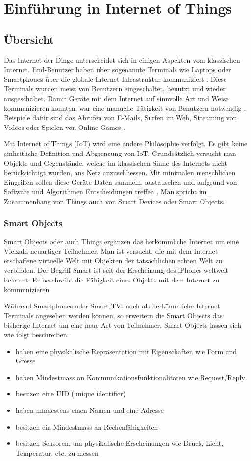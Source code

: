 \chapter{Einführung in Internet of Things}
\section{Übersicht}
Das Internet der Dinge unterscheidet sich in einigen Aspekten vom klassischen Internet. End-Benutzer haben über sogenannte Terminals wie Laptops oder Smartphones über die globale Internet Infrastruktur kommuniziert \cite{MiorandiSicariPellegriniChlamtac12}. Diese Terminals wurden meist von Benutzern eingeschaltet, benutzt und wieder ausgeschaltet. Damit Geräte mit dem Internet auf sinnvolle Art und Weise kommunizieren konnten, war eine manuelle Tätigkeit von Benutzern notwendig \cite{Radovici15}. Beispiele dafür sind das Abrufen von E-Mails, Surfen im Web, Streaming von Videos oder Spielen von Online Games \cite{MiorandiSicariPellegriniChlamtac12}.

Mit \glqq Internet of Things\grqq{} (IoT) wird eine andere Philosophie verfolgt. Es gibt keine einheitliche Definition und Abgrenzung von IoT. Grundsätzlich versucht man Objekte und Gegenstände, welche im klassischen Sinne des Internets nicht berücksichtigt wurden, ans Netz anzuschliessen. Mit minimalen menschlichen Eingriffen sollen diese Geräte Daten sammeln, austauschen und aufgrund von Software und Algorithmen Entscheidungen treffen \cite{RoseEldridgeChapin15}. Man spricht im Zusammenhang von \glqq Things \grqq{} auch von \glqq Smart Devices\grqq{} oder \glqq Smart Objects\grqq .
\subsection{Smart Objects}
Smart Objects oder auch \glqq Things\grqq{} ergänzen das herkömmliche Internet um eine Vielzahl neuartiger Teilnehmer. Man ist versucht, die mit dem Internet erschaffene virtuelle Welt mit Objekten der tatsächlichen \glqq echten\grqq{} Welt zu verbinden. Der Begriff \glqq Smart\grqq{} ist seit der Erscheinung des iPhones weltweit bekannt. Er beschreibt die Fähigkeit eines Objekts mit dem Internet zu kommunizieren. 

Während Smartphones oder Smart-TVs noch als herkömmliche Internet Terminals angesehen werden können, so erweitern die Smart Objects das bisherige Internet um eine neue Art von Teilnehmer. Smart Objects lassen sich wie folgt beschreiben:
\begin{itemize}
\item	haben eine physikalische Repräsentation mit Eigenschaften wie Form und Grösse
\item	haben Mindestmass an Kommunikationsfunktionalitäten wie Request/Reply
\item	besitzen eine UID (unique identifier)
\item	haben mindestens einen Namen und eine Adresse
\item	besitzen ein Mindestmass an Rechenfähigkeiten
\item	besitzen Sensoren, um physikalische Erscheinungen wie Druck, Licht, Temperatur, etc. zu messen
\end{itemize}

